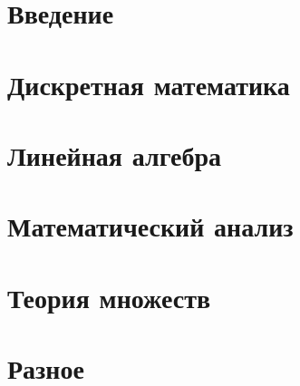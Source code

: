 \documentclass{report}
\begin{document}
\chapter*{Введение}

\tableofcontents
\chapter{Дискретная математика}

	
	
	

	
\chapter{Линейная алгебра}


	
	
	
\chapter{Математический анализ}

\chapter{Теория множеств}

	
	
	
	
\chapter{Разное}
\end{document}
